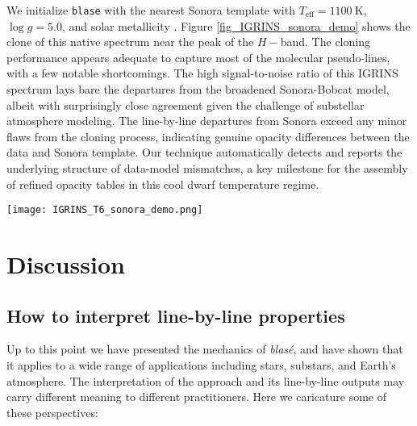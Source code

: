 \documentclass[trackchanges]{aastex631}
\begin{document}
We initialize \texttt{blase} with the nearest Sonora template with $T_\mathrm{eff} = 1100~\text{K}$, $\log{g}=5.0$, and solar metallicity \citep{2022MNRAS.tmp.1421T}.  Figure \ref{fig_IGRINS_sonora_demo} shows the clone of this native spectrum near the peak of the $H-$band. The cloning performance appears adequate to capture most of the molecular pseudo-lines, with a few notable shortcomings. The high signal-to-noise ratio of this IGRINS spectrum lays bare the departures from the broadened Sonora-Bobcat model, albeit with surprisingly close agreement given the challenge of substellar atmosphere modeling.  The line-by-line departures from Sonora exceed any minor flaws from the cloning process, indicating genuine opacity differences between the data and Sonora template.  Our technique automatically detects and reports the underlying structure of data-model mismatches, a key milestone for the assembly of refined opacity tables in this cool dwarf temperature regime.

\begin{figure*}[hbt!]
    \centering
    \texttt{[image: IGRINS\_T6\_sonora\_demo.png]}
    \caption{Line-by-line dissection of the 2MASS J08173001$-$6155158 IGRINS spectrum.  The \emph{top} panel compares the native Sonora-Bobcat spectrum to the blas\'e clone.  We match the RV shift of the observed spectrum (thick black line) and convolve the initial and learned Sonora template to the large $v\sin{i}$.  The bottom panel shows the locations and extents of line mismatches at the native resolution of Sonora.}
    \label{fig_IGRINS_sonora_demo}
\end{figure*}


\section{Discussion}\label{secDiscuss}

\subsection{How to interpret line-by-line properties}

Up to this point we have presented the mechanics of  \emph{blas\'e}, and have shown that it applies to a wide range of applications including stars, substars, and Earth's atmosphere. The interpretation of the approach and its line-by-line outputs may carry different meaning to different practitioners.  Here we caricature some of these perspectives:
\end{document}
